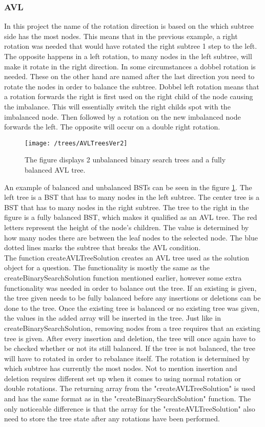 \subsubsection{AVL}
In this project the name of the rotation direction is based on the which subtree side has the most nodes. This means that in the previous example, a right rotation was needed that would have rotated the right subtree 1 step to the left. The opposite happens in a left rotation, to many nodes in the left subtree, will make it rotate in the right direction. In some circumstances a dobbel rotation is needed. These on the other hand are named after the last direction you need to rotate the nodes in order to balance the subtree. Dobbel left rotation means that a rotation forwards the right is first used on the right child of the node causing the imbalance. This will essentially switch the right childs spot with the imbalanced node. Then followed by a rotation on the new imbalanced node forwards the left. The opposite will occur on a double right rotation. 
\begin{figure}[H]
	\centering
	\texttt{[image: /trees/AVLTreesVer2]}	
	\caption{The figure displays 2 unbalanced binary search trees and a fully balanced AVL tree. }
	\label{fig:AVLTrees}
\end{figure}
\noindent
An example of balanced and unbalanced BSTs can be seen in the figure \ref{fig:AVLTrees}. The left tree is a BST that has to many nodes in the left subtree. The center tree is a BST that has to many nodes in the right subtree. The tree to the right in the figure is a fully balanced BST, which makes it qualified as an AVL tree. The red letters represent the height of the node's children. The value is determined by how many nodes there are between the leaf nodes to the selected node. The blue dotted lines marks the subtree that breaks the AVL condition.
\\[11pt]
The function createAVLTreeSolution creates an AVL tree used as the solution object for a question. The functionality is mostly the same as the createBinarySearchSolution function mentioned earlier, however some extra functionality was needed in order to balance out the tree. If an existing is given, the tree given needs to be fully balanced before any insertions or deletions can be done to the tree. Once the existing tree is balanced or no existing tree was given, the values in the added array will be inserted in the tree. Just like in createBinarySearchSolution, removing nodes from a tree requires that an existing tree is given. After every insertion and deletion, the tree will once again have to be checked whether or not its still balanced. If the tree is not balanced, the tree will have to rotated in order to rebalance itself. The rotation is determined by which subtree has currently the most nodes. Not to mention insertion and deletion requires different set up when it comes to using normal rotation or double rotations. The returning array from the "createAVLTreeSolution" is used and has the same format as in the "createBinarySearchSolution" function. The only noticeable difference is that the array for the "createAVLTreeSolution" also need to store the tree state after any rotations have been performed.
